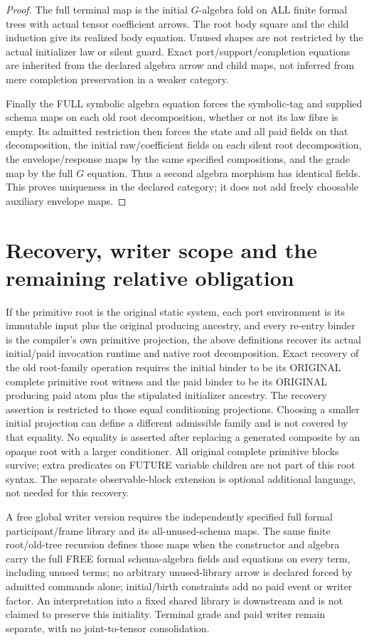 \documentclass[11pt]{article}
\begin{document}
\begin{proof}
The full terminal map is the initial $G$-algebra fold on ALL finite formal trees with actual tensor coefficient arrows. The root body square and the child induction give its realized body equation. Unused shapes are not restricted by the actual initializer law or silent guard. Exact port/support/completion equations are inherited from the declared algebra arrow and child maps, not inferred from mere completion preservation in a weaker category.

Finally the FULL symbolic algebra equation forces the symbolic-tag and supplied schema maps on each old root decomposition, whether or not its law fibre is empty. Its admitted restriction then forces the state and all paid fields on that decomposition, the initial raw/coefficient fields on each silent root decomposition, the envelope/response maps by the same specified compositions, and the grade map by the full $G$ equation. Thus a second algebra morphism has identical fields. This proves uniqueness in the declared category; it does not add freely choosable auxiliary envelope maps.\end{proof}

\section{Recovery, writer scope and the remaining relative obligation}
If the primitive root is the original static system, each port environment is its immutable input plus the original producing ancestry, and every re-entry binder is the compiler's own primitive projection, the above definitions recover its actual initial/paid invocation runtime and native root decomposition. Exact recovery of the old root-family operation requires the initial binder to be its ORIGINAL complete primitive root witness and the paid binder to be its ORIGINAL producing paid atom plus the stipulated initializer ancestry. The recovery assertion is restricted to those equal conditioning projections. Choosing a smaller initial projection can define a different admissible family and is not covered by that equality. No equality is asserted after replacing a generated composite by an opaque root with a larger conditioner. All original complete primitive blocks survive; extra predicates on FUTURE variable children are not part of this root syntax. The separate observable-block extension is optional additional language, not needed for this recovery.

A free global writer version requires the independently specified full formal participant/frame library and its all-unused-schema maps. The same finite root/old-tree recursion defines those maps when the constructor and algebra carry the full FREE formal schema-algebra fields and equations on every term, including unused terms; no arbitrary unused-library arrow is declared forced by admitted commands alone; initial/birth constraints add no paid event or writer factor. An interpretation into a fixed shared library is downstream and is not claimed to preserve this initiality. Terminal grade and paid writer remain separate, with no joint-to-tensor consolidation.
\end{document}
